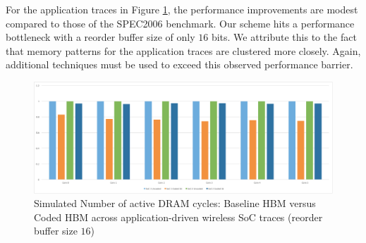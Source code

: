%
%
%

For the application traces in Figure \ref{fig:lte_umts}, the performance improvements are modest compared to those of the SPEC2006 benchmark. Our scheme hits a performance bottleneck with a reorder buffer size of only $16$ bits. We attribute this to the fact that memory patterns for the application traces are clustered more closely. Again, additional techniques must be used to exceed this observed performance barrier. \\

\begin{figure}[htb] \centering
\includegraphics[width=0.75\linewidth]{figures/soc.pdf} 
\caption{Simulated Number of active DRAM cycles: Baseline HBM versus Coded HBM across application-driven wireless SoC traces (reorder buffer size $16$) }
\label{fig:lte_umts}
\end{figure}

%
%



